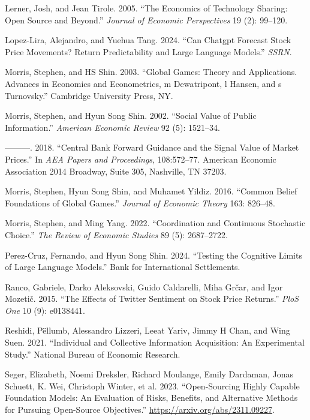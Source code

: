 \documentclass[
]{article}
\newlength{\cslhangindent}
\newenvironment{CSLReferences}[2] %
 {\begin{list}{}{%
  \setlength{\itemindent}{0pt}
  \setlength{\leftmargin}{0pt}
  \setlength{\parsep}{0pt}
  \ifodd #1
   \setlength{\leftmargin}{\cslhangindent}
   \setlength{\itemindent}{-1\cslhangindent}
  \fi
  \setlength{\itemsep}{#2\baselineskip}}}
 {\end{list}}
\theoremstyle{plain}
\theoremstyle{definition}
\theoremstyle{remark}
\begin{document}
\begin{CSLReferences}{1}{0}
Lerner, Josh, and Jean Tirole. 2005. {``The Economics of Technology
Sharing: Open Source and Beyond.''} \emph{Journal of Economic
Perspectives} 19 (2): 99--120.

Lopez-Lira, Alejandro, and Yuehua Tang. 2024. {``Can Chatgpt Forecast
Stock Price Movements? Return Predictability and Large Language
Models.''} \emph{SSRN}.

Morris, Stephen, and HS Shin. 2003. {``Global Games: Theory and
Applications. Advances in Economics and Econometrics, m Dewatripont, l
Hansen, and s Turnovsky.''} Cambridge University Press, NY.

Morris, Stephen, and Hyun Song Shin. 2002. {``Social Value of Public
Information.''} \emph{American Economic Review} 92 (5): 1521--34.

---------. 2018. {``Central Bank Forward Guidance and the Signal Value
of Market Prices.''} In \emph{AEA Papers and Proceedings}, 108:572--77.
American Economic Association 2014 Broadway, Suite 305, Nashville, TN
37203.

Morris, Stephen, Hyun Song Shin, and Muhamet Yildiz. 2016. {``Common
Belief Foundations of Global Games.''} \emph{Journal of Economic Theory}
163: 826--48.

Morris, Stephen, and Ming Yang. 2022. {``Coordination and Continuous
Stochastic Choice.''} \emph{The Review of Economic Studies} 89 (5):
2687--2722.

Perez-Cruz, Fernando, and Hyun Song Shin. 2024. {``Testing the Cognitive
Limits of Large Language Models.''} Bank for International Settlements.

Ranco, Gabriele, Darko Aleksovski, Guido Caldarelli, Miha Grčar, and
Igor Mozetič. 2015. {``The Effects of Twitter Sentiment on Stock Price
Returns.''} \emph{PloS One} 10 (9): e0138441.

Reshidi, Pëllumb, Alessandro Lizzeri, Leeat Yariv, Jimmy H Chan, and
Wing Suen. 2021. {``Individual and Collective Information Acquisition:
An Experimental Study.''} National Bureau of Economic Research.

Seger, Elizabeth, Noemi Dreksler, Richard Moulange, Emily Dardaman,
Jonas Schuett, K. Wei, Christoph Winter, et al. 2023. {``Open-Sourcing
Highly Capable Foundation Models: An Evaluation of Risks, Benefits, and
Alternative Methods for Pursuing Open-Source Objectives.''}
\url{https://arxiv.org/abs/2311.09227}.


\end{CSLReferences}
\end{document}
